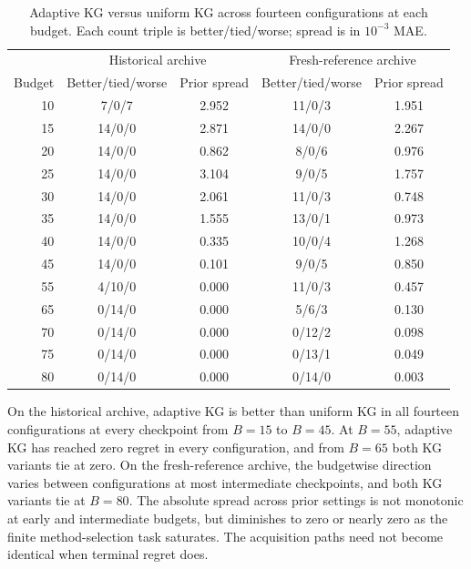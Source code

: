 \documentclass[10pt,a4paper]{article}
\begin{document}
\begin{table}[ht]
\centering
\small
\caption{Adaptive KG versus uniform KG across fourteen configurations
at each budget. Each count triple is better/tied/worse; spread is in
$10^{-3}$ MAE.}
\label{tab:prior-budget-diagnostics}
\begin{tabular}{rcccc}
\toprule
& \multicolumn{2}{c}{Historical archive}
& \multicolumn{2}{c}{Fresh-reference archive}\\
Budget & Better/tied/worse & Prior spread
& Better/tied/worse & Prior spread\\
\midrule
10 & 7/0/7 & 2.952 & 11/0/3 & 1.951 \\
15 & 14/0/0 & 2.871 & 14/0/0 & 2.267 \\
20 & 14/0/0 & 0.862 & 8/0/6 & 0.976 \\
25 & 14/0/0 & 3.104 & 9/0/5 & 1.757 \\
30 & 14/0/0 & 2.061 & 11/0/3 & 0.748 \\
35 & 14/0/0 & 1.555 & 13/0/1 & 0.973 \\
40 & 14/0/0 & 0.335 & 10/0/4 & 1.268 \\
45 & 14/0/0 & 0.101 & 9/0/5 & 0.850 \\
55 & 4/10/0 & 0.000 & 11/0/3 & 0.457 \\
65 & 0/14/0 & 0.000 & 5/6/3 & 0.130 \\
70 & 0/14/0 & 0.000 & 0/12/2 & 0.098 \\
75 & 0/14/0 & 0.000 & 0/13/1 & 0.049 \\
80 & 0/14/0 & 0.000 & 0/14/0 & 0.003 \\
\bottomrule
\end{tabular}
\end{table}

On the historical archive, adaptive KG is better than uniform KG in
all fourteen configurations at every checkpoint from $B=15$ to
$B=45$. At $B=55$, adaptive KG has reached zero regret in every
configuration, and from $B=65$ both KG variants tie at zero.
On the fresh-reference archive, the budgetwise direction varies
between configurations at most intermediate checkpoints, and both
KG variants tie at $B=80$. The absolute spread across prior
settings is not monotonic at early and intermediate budgets, but
diminishes to zero or nearly zero as the finite method-selection
task saturates. The acquisition paths need not become identical
when terminal regret does.
\end{document}
